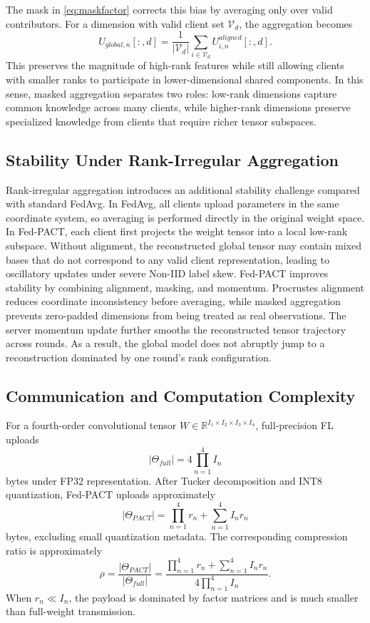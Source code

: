 \documentclass[conference]{IEEEtran}
\begin{document}
The mask in \eqref{eq:maskfactor} corrects this bias by averaging only over valid contributors. For a dimension with valid client set $\mathcal{V}_d$, the aggregation becomes
\begin{equation}
    U_{global,n}[:,d]=\frac{1}{|\mathcal{V}_d|}\sum_{i\in \mathcal{V}_d}U_{i,n}^{aligned}[:,d].
\end{equation}
This preserves the magnitude of high-rank features while still allowing clients with smaller ranks to participate in lower-dimensional shared components. In this sense, masked aggregation separates two roles: low-rank dimensions capture common knowledge across many clients, while higher-rank dimensions preserve specialized knowledge from clients that require richer tensor subspaces.

\subsection{Stability Under Rank-Irregular Aggregation}
Rank-irregular aggregation introduces an additional stability challenge compared with standard FedAvg. In FedAvg, all clients upload parameters in the same coordinate system, so averaging is performed directly in the original weight space. In Fed-PACT, each client first projects the weight tensor into a local low-rank subspace. Without alignment, the reconstructed global tensor may contain mixed bases that do not correspond to any valid client representation, leading to oscillatory updates under severe Non-IID label skew.
Fed-PACT improves stability by combining alignment, masking, and momentum. Procrustes alignment reduces coordinate inconsistency before averaging, while masked aggregation prevents zero-padded dimensions from being treated as real observations. The server momentum update further smooths the reconstructed tensor trajectory across rounds. As a result, the global model does not abruptly jump to a reconstruction dominated by one round's rank configuration.

\subsection{Communication and Computation Complexity}
For a fourth-order convolutional tensor
$W\in \mathbb{R}^{I_1\times I_2\times I_3\times I_4}$,
full-precision FL uploads
\begin{equation}
    |\Theta_{full}|=4\prod_{n=1}^{4}I_n
\end{equation}
bytes under FP32 representation. After Tucker decomposition and INT8 quantization, Fed-PACT uploads approximately
\begin{equation}
    |\Theta_{PACT}|=\prod_{n=1}^{4}r_n+\sum_{n=1}^{4}I_nr_n
\end{equation}
bytes, excluding small quantization metadata. The corresponding compression ratio is approximately
\begin{equation}
    \rho=\frac{|\Theta_{PACT}|}{|\Theta_{full}|}=\frac{\prod_{n=1}^{4}r_n+\sum_{n=1}^{4}I_nr_n}{4\prod_{n=1}^{4}I_n}.
\end{equation}
When $r_n\ll I_n$, the payload is dominated by factor matrices and is much smaller than full-weight transmission.
\end{document}

